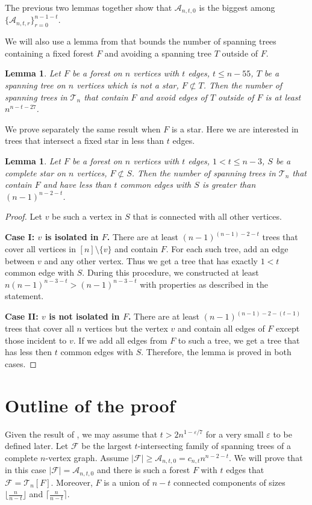 \documentclass[11pt,letterpaper]{amsart}
\newcommand{\eps}{\varepsilon}
\renewcommand{\le}{\leqslant}
\renewcommand{\ge}{\geqslant}
\newcommand{\ff}{\mathcal{F}}
\newcommand{\aaa}{\mathcal{A}}
\newcommand{\T}{\mathcal{T}}
\newtheorem{lemma}[theorem]{Lemma}
\begin{document}
The previous two lemmas together show that $\aaa_{n, t, 0}$ is the biggest among $\{\aaa_{n, t, r}\}_{r = 0}^{n-1-t}$.

We will also use a lemma from \cite{EKR_trees} that bounds the number of spanning trees containing a fixed forest $F$ and avoiding a spanning tree $T$ outside of $F$.

\begin{lemma}\label{avoiding}
    Let $F$ be a forest on $n$ vertices with $t$ edges, $t \le n - 55$, $T$ be a spanning tree on $n$ vertices which is not a star, $F \not\subset T$. Then the number of spanning trees in $\T_n$ that contain $F$ and avoid edges of $T$ outside of $F$ is at least $n^{n-t-27}$.
\end{lemma}

We prove separately the same result when $F$ is a star. Here we are interested in trees that intersect a fixed star in less than $t$ edges.

\begin{lemma}\label{avoiding_star}
    Let $F$ be a forest on $n$ vertices with $t$ edges, $1 < t \le n - 3$, $S$ be a complete star on $n$ vertices, $F \not\subset S$. Then the number of spanning trees in $\T_n$ that contain $F$ and have less than $t$ common edges with $S$ is greater than $(n-1)^{n-2-t}$.
\end{lemma}
\begin{proof}
    Let $v$ be such a vertex in $S$ that is connected with all other vertices.

    \textbf{Case I: $v$ is isolated in $F$.} There are at least $(n-1)^{(n-1) - 2 - t}$ trees that cover all vertices in $[n]\setminus \{v\}$ and contain $F$. For each such tree, add an edge between $v$ and any other vertex. Thus we get a tree that has exactly $1 < t$ common edge with $S$. During this procedure, we constructed at least $n(n-1)^{n-3-t} > (n-1)^{n-3-t}$ with properties as described in the statement.

    

    \textbf{Case II: $v$ is not isolated in $F$.} There are at least $(n-1)^{(n-1) - 2 - (t-1)}$ trees that cover all $n$ vertices but the vertex $v$ and contain all edges of $F$ except those incident to $v$. If we add all edges from $F$ to such a tree, we get a tree that has less then $t$ common edges with $S$. Therefore, the lemma is proved in both cases.
\end{proof}

\section{Outline of the proof}
Given the result of \cite{EKR_trees}, we may assume that $t > 2n^{1 - \eps/7}$ for a very small $\eps$ to be defined later. Let $\ff$ be the largest $t$-intersecting family of spanning trees of a complete $n$-vertex graph. Assume $|\ff| \ge \aaa_{n, t, 0} = c_{n, t}n^{n-2-t}$. We will prove that in this case $|\ff| = \aaa_{n, t, 0}$  and there is such a forest $F$ with $t$ edges that $\ff = \T_n[F]$. Moreover, $F$ is a union of $n-t$ connected components of sizes  $\lfloor\frac{n}{n-t}\rfloor$ and $\lceil\frac{n}{n-t}\rceil$. 
\end{document}
